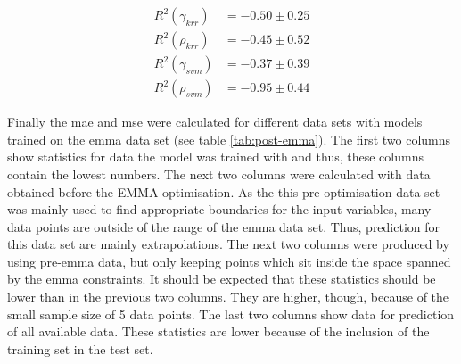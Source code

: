 \begin{align}
    \label{eq:r2-krr-g}
    R^2(\gamma_{krr}) &= -0.50 \pm 0.25\\
    \label{eq:r2-krr-p}
    R^2(\rho_{krr})   &= -0.45 \pm 0.52\\
    \label{eq:r2-svm-g}
    R^2(\gamma_{svm}) &= -0.37 \pm 0.39\\
    \label{eq:r2-svm-p}
    R^2(\rho_{svm})   &= -0.95 \pm 0.44
\end{align}

%
Finally the \gls{mae} and \gls{mse} were calculated for different data sets with models 
trained on the \gls{emma} data set (see table \ref{tab:post-emma}). 
The first two columns show statistics for data the model was trained with and thus, 
these columns contain the lowest numbers. 
The next two columns were calculated with data obtained before the EMMA optimisation. 
As the this pre-optimisation data set was mainly used to find appropriate boundaries for the input variables, 
many data points are outside of the range of the \gls{emma} data set. 
Thus, prediction for this data set are mainly extrapolations. 
The next two columns were produced by using pre-\gls{emma} data, 
but only keeping points which sit inside the space spanned by the \gls{emma} constraints. 
It should be expected that these statistics should be lower than in the previous two columns. 
They are higher, though, because of the small sample size of 5 data points. 
The last two columns show data for prediction of all available data. 
These statistics are lower because of the inclusion of the training set in the test set. 

